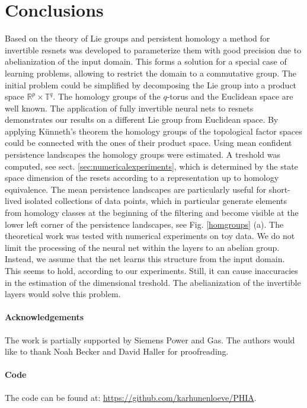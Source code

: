 \documentclass[envcountsect,runningheads]{llncs}
\begin{document}
\section{Conclusions}
\label{sec:conclusion}
Based on the theory of Lie groups and persistent homology a method for invertible resnets was developed to parameterize them with good precision due to abelianization of the input domain. This forms a solution for a special case of learning problems, allowing to restrict the domain to a commutative group. The initial problem could be simplified by decomposing the Lie group into a product space $\mathbb{R}^p \times \mathbb{T}^q$. The homology groups of the $q$-torus and the Euclidean space are well known. The application of fully invertible neural nets to resnets demonstrates our results on a different Lie group from Euclidean space. By applying Künneth's theorem the homology groups of the topological factor spaces could be connected with the ones of their product space. Using mean confident persistence landscapes the homology groups were estimated. A treshold was computed, see sect. \ref{sec:numericalexperiments}, which is determined by the state space dimension of the resets according to a representation up to homology equivalence. The mean persistence landscapes are particularly useful for short-lived isolated collections of data points, which in particular generate elements from homology classes at the beginning of the filtering and become visible at the lower left corner of the persistence landscapes, see Fig. \ref{homgroups} (a). The theoretical work was tested with numerical experiments on toy data. We do not limit the processing of the neural net within the layers to an abelian group. Instead, we assume that the net learns this structure from the input domain. This seems to hold, according to our experiments. Still, it can cause inaccuracies in the estimation of the dimensional treshold. The abelianization of the invertible layers would solve this problem.

\paragraph{Acknowledgements} The work is partially supported by Siemens Power and Gas. The authors would like to thank Noah Becker and David Haller for proofreading.

\paragraph{Code} The code can be found at: \href{https://github.com/karhunenloeve/PHIA}{https://github.com/karhunenloeve/PHIA}.
%
%
%
%
%
%
%
\newpage
\appendix
\end{document}
